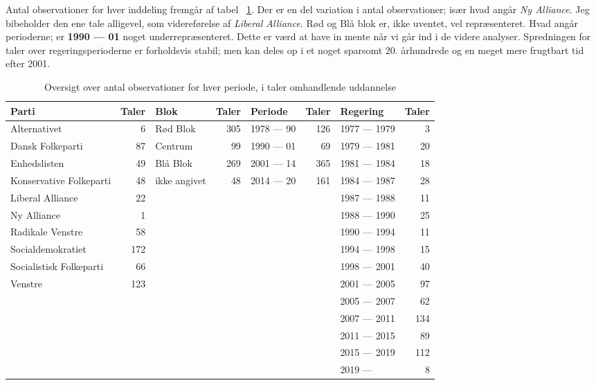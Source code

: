 Antal observationer for hver inddeling fremgår af tabel ~\ref{tab:obs}.
Der er en del variation i antal observationer; især hvad angår \textit{Ny Alliance}.
Jeg bibeholder den ene tale alligevel, som videreførelse af \textit{Liberal Alliance}.
Rød og Blå blok er, ikke uventet, vel repræsenteret.
Hvad angår perioderne; er \textbf{1990 --- 01} noget underrepræsenteret.
Dette er værd at have in mente når vi går ind i de videre analyser.
Spredningen for taler over regeringsperioderne er forholdsvis stabil; men kan deles op i et noget sparsomt 20. århundrede og en meget mere frugtbart tid efter 2001.

\begin{table}
 \caption{Oversigt over antal observationer for hver periode, i taler omhandlende uddannelse}
 \label{tab:obs}
\begin{adjustwidth}{-.5in}{-.5in}
\begin{tabular}{lrlrlrlr}
 Parti          & Taler & Blok    & Taler & Periode & Taler & Regering  & Taler \\
 \midrule
 Alternativet      & 6   & Rød Blok   & 305  & 1978 --- 90 & 126  & 1977 --- 1979 &  3 \\
 Dansk Folkeparti    & 87  & Centrum   & 99  & 1990 --- 01 & 69  & 1979 --- 1981 & 20 \\
 Enhedslisten      & 49  & Blå Blok   & 269  & 2001 --- 14 & 365  & 1981 --- 1984 & 18 \\
 Konservative Folkeparti & 48  & ikke angivet & 48  & 2014 --- 20 & 161  & 1984 --- 1987 & 28 \\
 Liberal Alliance    & 22  &       &    &     &    & 1987 --- 1988 & 11 \\
 Ny Alliance       & 1   &       &    &     &    & 1988 --- 1990 & 25 \\
 Radikale Venstre    & 58  &       &    &     &    & 1990 --- 1994 & 11 \\
 Socialdemokratiet    & 172  &       &    &     &    & 1994 --- 1998 & 15 \\
 Socialistisk Folkeparti & 66  &       &    &     &    & 1998 --- 2001 & 40 \\
 Venstre         & 123  &       &    &     &    & 2001 --- 2005 & 97 \\
             &    &       &    &     &    & 2005 --- 2007 & 62 \\
             &    &       &    &     &    & 2007 --- 2011 & 134 \\
             &    &       &    &     &    & 2011 --- 2015 & 89 \\
             &    &       &    &     &    & 2015 --- 2019 & 112 \\
             &    &       &    &     &    & 2019 ---    &  8 \\
 \bottomrule
 \end{tabular} 
\end{adjustwidth}
 \end{table}


